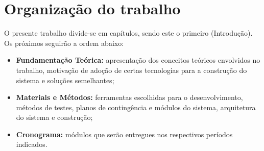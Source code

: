 \section{Organização do trabalho}
O presente trabalho divide-se em capítulos, sendo este o primeiro (Introdução). Os próximos seguirão a ordem abaixo:

\begin{itemize}
  \item \textbf{Fundamentação Teórica:} apresentação dos conceitos teóricos envolvidos no trabalho, motivação de
  adoção de certas tecnologias para a construção do sistema e soluções semelhantes;
  \item \textbf{Materiais e Métodos:} ferramentas escolhidas para o desenvolvimento, métodos de testes, planos de contingência e módulos
  do sistema, arquitetura do sistema e construção;
  \item \textbf{Cronograma:} módulos que serão entregues nos respectivos períodos indicados.
\end{itemize}

